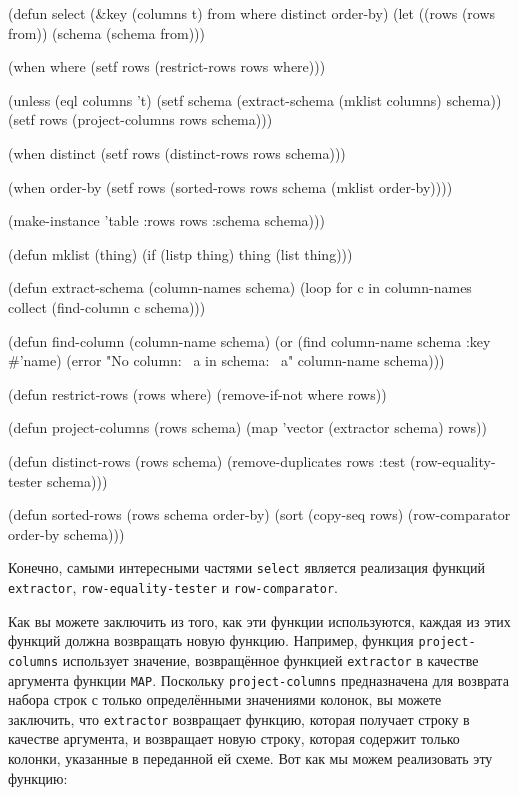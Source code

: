 \begin{myverb}
(defun select (&key (columns t) from where distinct order-by)
  (let ((rows (rows from))
        (schema (schema from)))

    (when where
      (setf rows (restrict-rows rows where)))

    (unless (eql columns 't)
      (setf schema (extract-schema (mklist columns) schema))
      (setf rows (project-columns rows schema)))

    (when distinct
      (setf rows (distinct-rows rows schema)))

    (when order-by
      (setf rows (sorted-rows rows schema (mklist order-by))))

    (make-instance 'table :rows rows :schema schema)))

(defun mklist (thing)
  (if (listp thing) thing (list thing)))

(defun extract-schema (column-names schema)
  (loop for c in column-names collect (find-column c schema)))

(defun find-column (column-name schema)
  (or (find column-name schema :key #'name)
      (error "No column: ~a in schema: ~a" column-name schema)))

(defun restrict-rows (rows where)
  (remove-if-not where rows))

(defun project-columns (rows schema)
  (map 'vector (extractor schema) rows))

(defun distinct-rows (rows schema)
  (remove-duplicates rows :test (row-equality-tester schema)))

(defun sorted-rows (rows schema order-by)
  (sort (copy-seq rows) (row-comparator order-by schema)))
\end{myverb}

Конечно, самыми интересными частями \lstinline{select} является реализация функций
\lstinline{extractor}, \lstinline{row-equality-tester} и \lstinline{row-comparator}.

Как вы можете заключить из того, как эти функции используются, каждая из этих функций
должна возвращать новую функцию.  Например, функция \lstinline{project-columns} использует
значение, возвращённое функцией \lstinline{extractor} в качестве аргумента функции \lstinline{MAP}.
Поскольку \lstinline{project-columns} предназначена для возврата набора строк с только
определёнными значениями колонок, вы можете заключить, что \lstinline{extractor} возвращает
функцию, которая получает строку в качестве аргумента, и возвращает новую строку, которая
содержит только колонки, указанные в переданной ей схеме.  Вот как мы можем реализовать
эту функцию:

